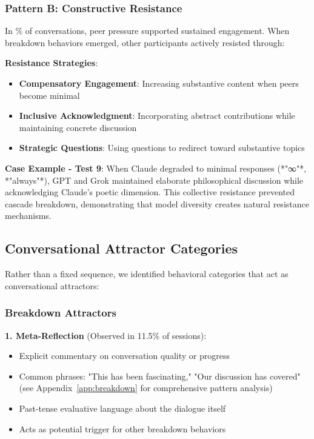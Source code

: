 \documentclass[11pt,letterpaper]{article}
\newcommand{\exponedataTotalSessionsRaw}{26}
\newcommand{\exponedataRecoverySessionsRaw}{9}
\newcommand{\exponedataRecoveryPercentage}{%
  \fpeval{round(\exponedataRecoverySessionsRaw / \exponedataTotalSessionsRaw * 100, 1)}\%
}
\newcommand{\exponedataMetaReflectionTriggers}{11.5\%}
\begin{document}
\subsubsection{Pattern B: Constructive Resistance}

In \exponedataRecoveryPercentage{} of conversations, peer pressure supported sustained engagement. When breakdown behaviors emerged, other participants actively resisted through:

\textbf{Resistance Strategies}:
\begin{itemize}
    \item \textbf{Compensatory Engagement}: Increasing substantive content when peers become minimal
    \item \textbf{Inclusive Acknowledgment}: Incorporating abstract contributions while maintaining concrete discussion
    \item \textbf{Strategic Questions}: Using questions to redirect toward substantive topics
\end{itemize}

\textbf{Case Example - Test 9}:
When Claude degraded to minimal responses (*"∞"*, *"always"*), GPT and Grok maintained elaborate philosophical discussion while acknowledging Claude's poetic dimension. This collective resistance prevented cascade breakdown, demonstrating that model diversity creates natural resistance mechanisms.

\subsection{Conversational Attractor Categories}

Rather than a fixed sequence, we identified behavioral categories that act as conversational attractors:

\subsubsection{Breakdown Attractors}

\textbf{1. Meta-Reflection} (Observed in \exponedataMetaReflectionTriggers{} of sessions):
\begin{itemize}
    \item Explicit commentary on conversation quality or progress
    \item Common phrases: "This has been fascinating," "Our discussion has covered" (see Appendix~\ref{app:breakdown} for comprehensive pattern analysis)
    \item Past-tense evaluative language about the dialogue itself
    \item Acts as potential trigger for other breakdown behaviors
\end{itemize}
\end{document}
